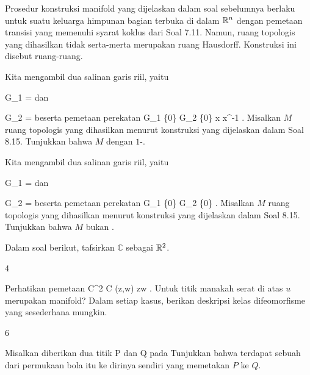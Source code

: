 Prosedur konstruksi manifold yang dijelaskan dalam soal sebelumnya berlaku untuk suatu keluarga himpunan bagian terbuka di dalam ${\mathbb R}^n$ dengan pemetaan transisi yang memenuhi syarat koklus dari
Soal 7.11.
Namun, ruang topologis yang dihasilkan tidak serta-merta merupakan ruang Hausdorff. Konstruksi ini disebut  {} ruang-ruang.

{}
{

Kita mengambil dua salinan garis riil, yaitu

\mavergleichskette
{\vergleichskette
{G_1
}
{ = }{\R
}
{  }{
}
{    }{
}
{   }{
}
}
{}{}{}
dan

\mavergleichskette
{\vergleichskette
{G_2
}
{ = }{\R
}
{  }{
}
{    }{
}
{   }{
}
}
{}{}{}
beserta pemetaan perekatan
\maabbeledisp {\varphi} {G_1 \setminus \{0\} } { G_2 \setminus \{0\}
} { x } { x^{-1}
} {.}
Misalkan $M$ ruang topologis yang dihasilkan menurut konstruksi yang dijelaskan dalam
Soal 8.15.
Tunjukkan bahwa $M$
dengan
$1$-.

}
{} {}

{}
{

Kita mengambil dua salinan garis riil, yaitu

\mavergleichskette
{\vergleichskette
{G_1
}
{ = }{\R
}
{  }{
}
{    }{
}
{   }{
}
}
{}{}{}
dan

\mavergleichskette
{\vergleichskette
{G_2
}
{ = }{\R
}
{  }{
}
{    }{
}
{   }{
}
}
{}{}{}
beserta pemetaan perekatan
 {G_1 \setminus \{0\} } { G_2 \setminus \{0\}
} {.}
Misalkan $M$ ruang topologis yang dihasilkan menurut konstruksi yang dijelaskan dalam
Soal 8.15.
Tunjukkan bahwa $M$ bukan
.

}
{} {}


Dalam soal berikut, tafsirkan ${\mathbb C}$ sebagai ${\mathbb R}^2$.

{4}
{

Perhatikan pemetaan
\maabbeledisp {} { {\mathbb C}^2} { {\mathbb C}
} {(z,w)} { zw
} {.}
Untuk titik manakah
 serat di atas $u$ merupakan manifold? Dalam setiap kasus, berikan deskripsi kelas difeomorfisme yang sesederhana mungkin.

}
{} {}

{6}
{

Misalkan diberikan dua titik
\mathkor {} {P} {dan} {Q} {}
pada
Tunjukkan bahwa terdapat sebuah
dari permukaan bola itu ke dirinya sendiri yang memetakan $P$ ke $Q$.

}
{} {}


